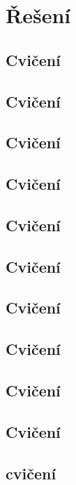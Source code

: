 \documentclass[a4paper,10pt]{book}
\begin{document}
\chapter{Řešení}
	\renewcommand{\solution}[1]{
		{\normalfont
			\textbf{\emph{Řešení:}}
			#1
		}
	}
	\renewcommand{\exercise}[2]{ %
		\textbf{
			\label{sol:#2}
			
			\newpage
		}
	}
	\section[1. Cvičení]{Cvičení}
 
	\section[2. Cvičení]{Cvičení}
 
	\section[3. Cvičení]{Cvičení}
 
	\section[4. Cvičení]{Cvičení}
 
	\section[5. Cvičení]{Cvičení}
 
	\section[6. Cvičení]{Cvičení}
 
	\section[7. Cvičení]{Cvičení}
 
	\section[8. Cvičení]{Cvičení}
 
	\section[9. Cvičení]{Cvičení}
 
	\section[10. Cvičení]{Cvičení}
 
	\section[11. cvičení]{cvičení}
 
\end{document}
